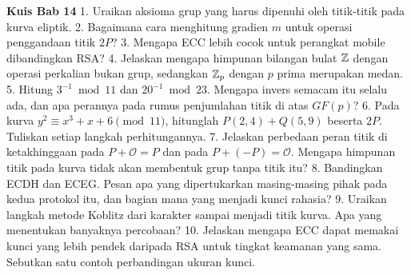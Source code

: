 
\begin{obeassessment}
\textbf{Kuis Bab 14}
1. Uraikan aksioma grup yang harus dipenuhi oleh titik-titik pada kurva
   eliptik.
2. Bagaimana cara menghitung gradien $m$ untuk operasi penggandaan titik $2P$?
3. Mengapa ECC lebih cocok untuk perangkat mobile dibandingkan RSA?
4. Jelaskan mengapa himpunan bilangan bulat $\mathbb{Z}$ dengan operasi perkalian
   bukan grup, sedangkan $\mathbb{Z}_p$ dengan $p$ prima merupakan medan.
5. Hitung $3^{-1} \bmod 11$ dan $20^{-1} \bmod 23$. Mengapa invers semacam itu
   selalu ada, dan apa perannya pada rumus penjumlahan titik di atas $GF(p)$?
6. Pada kurva $y^2 \equiv x^3 + x + 6 \pmod{11}$, hitunglah $P(2,4) + Q(5,9)$
   beserta $2P$. Tuliskan setiap langkah perhitungannya.
7. Jelaskan perbedaan peran titik di ketakhinggaan pada $P + \mathcal{O} = P$
   dan pada $P + (-P) = \mathcal{O}$. Mengapa himpunan titik pada kurva tidak
   akan membentuk grup tanpa titik itu?
8. Bandingkan ECDH dan ECEG. Pesan apa yang dipertukarkan masing-masing pihak
   pada kedua protokol itu, dan bagian mana yang menjadi kunci rahasia?
9. Uraikan langkah metode Koblitz dari karakter sampai menjadi titik kurva.
   Apa yang menentukan banyaknya percobaan?
10. Jelaskan mengapa ECC dapat memakai kunci yang lebih pendek daripada RSA
    untuk tingkat keamanan yang sama. Sebutkan satu contoh perbandingan
    ukuran kunci.
\end{obeassessment}
